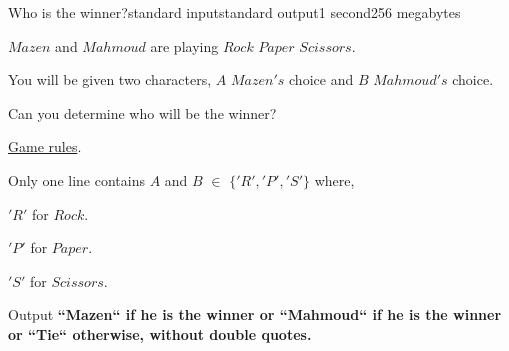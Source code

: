 \begin{problem}{Who is the winner?}{standard input}{standard output}{1 second}{256 megabytes}

$Mazen$ and $Mahmoud$ are playing $Rock$ $Paper$ $Scissors$.

You will be given two characters, $A$ $Mazen's$ choice and $B$ $Mahmoud's$ choice.

Can you determine who will be the winner?

\href{https://wrpsa.com/the-official-rules-of-rock-paper-scissors/}{Game rules}.

\InputFile
Only one line contains $A$ and $B$ $\in$ $\{'R','P','S' \}$ where,

$'R'$ for $Rock$.

$'P'$ for $Paper$.

$'S'$ for $Scissors$.

\OutputFile
Output \bf{``Mazen``} if he is the winner or \bf{``Mahmoud``} if he is the winner or \bf{``Tie``} otherwise, without double quotes.

\Examples

\begin{example}
%
%
%
\end{example}

\end{problem}

